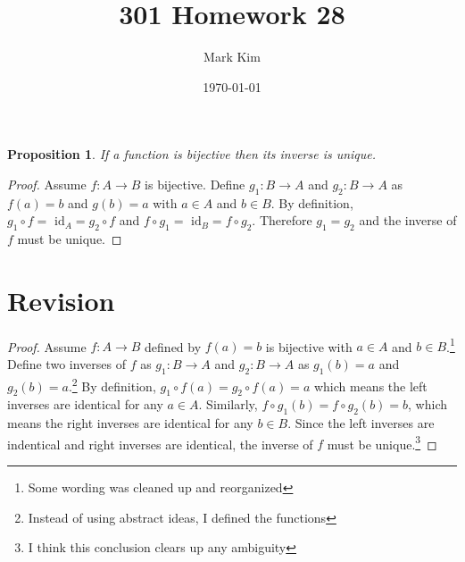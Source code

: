 \documentclass[12pt]{amsart}
\title{301 Homework 28}
\author{Mark Kim}
\date{\today}
\newtheorem*{proposition}{Proposition}
\begin{document}
\maketitle

\begin{proposition}
If a function is bijective then its inverse is unique.
\end{proposition}

\begin{proof}
Assume $f\colon A\rightarrow B$ is bijective.  Define $g_1\colon B\rightarrow A$ and $g_2\colon B\rightarrow A$ as $f(a)=b$ and $g(b)=a$ with $a\in A$ and $b\in B$.  By definition, $g_1\circ f = \text{ id}_A = g_2\circ f$ and $f\circ g_1 = \text{ id}_B = f\circ g_2$.  Therefore $g_1 = g_2$ and the inverse of $f$ must be unique.
\end{proof}

\section{Revision}

\begin{proof}
Assume $f\colon A\rightarrow B$ defined by $f(a)=b$ is bijective with $a\in A$ and $b\in B$.\footnote{Some wording was cleaned up and reorganized}  Define two inverses of $f$ as $g_1\colon B\rightarrow A$ and $g_2\colon B\rightarrow A$ as $g_1(b)=a$ and $g_2(b)=a$.\footnote{Instead of using abstract ideas, I defined the functions}  By definition, $g_1\circ f(a) = g_2\circ f(a) = a$ which means the left inverses are identical for any $a\in A$.  Similarly, $f\circ g_1(b) = f\circ g_2(b) = b$, which means the right inverses are identical for any $b\in B$.  Since the left inverses are indentical and right inverses are identical, the inverse of $f$ must be unique.\footnote{I think this conclusion clears up any ambiguity}
\end{proof}
\end{document}
